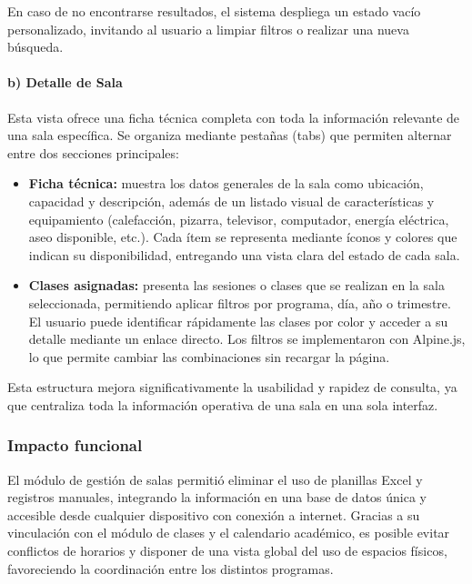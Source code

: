 En caso de no encontrarse resultados, el sistema despliega un estado vacío personalizado, invitando al usuario a limpiar filtros o realizar una nueva búsqueda.

\paragraph{b) Detalle de Sala}

Esta vista ofrece una ficha técnica completa con toda la información relevante de una sala específica. Se organiza mediante pestañas (tabs) que permiten alternar entre dos secciones principales:

\begin{itemize}
    \item \textbf{Ficha técnica:} muestra los datos generales de la sala como ubicación, capacidad y descripción, además de un listado visual de características y equipamiento (calefacción, pizarra, televisor, computador, energía eléctrica, aseo disponible, etc.). Cada ítem se representa mediante íconos y colores que indican su disponibilidad, entregando una vista clara del estado de cada sala.
    
    \item \textbf{Clases asignadas:} presenta las sesiones o clases que se realizan en la sala seleccionada, permitiendo aplicar filtros por programa, día, año o trimestre. El usuario puede identificar rápidamente las clases por color y acceder a su detalle mediante un enlace directo. Los filtros se implementaron con Alpine.js, lo que permite cambiar las combinaciones sin recargar la página.
\end{itemize}

Esta estructura mejora significativamente la usabilidad y rapidez de consulta, ya que centraliza toda la información operativa de una sala en una sola interfaz.

\subsubsection{Impacto funcional}

El módulo de gestión de salas permitió eliminar el uso de planillas Excel y registros manuales, integrando la información en una base de datos única y accesible desde cualquier dispositivo con conexión a internet. Gracias a su vinculación con el módulo de clases y el calendario académico, es posible evitar conflictos de horarios y disponer de una vista global del uso de espacios físicos, favoreciendo la coordinación entre los distintos programas.

